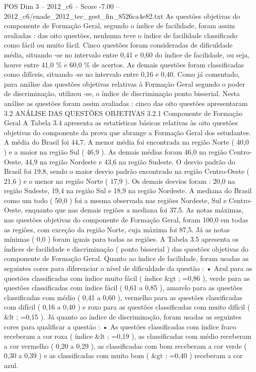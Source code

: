\begin{textsample}{POS Dim 3 – 2012\_c6 – Score -7.00 – 2012\_c6/enade\_2012\_tec\_gest\_fin\_8526ca4e82.txt}
As questões objetivas do componente de Formação Geral, segundo o índice de facilidade, foram assim avaliadas : das oito questões, nenhuma teve o índice de facilidade classificado como fácil ou muito fácil.
Cinco questões foram consideradas de dificuldade média, situando -se no intervalo entre 0,41 e 0,60 do índice de facilidade, ou seja, houve entre 41,0 \% e 60,0 \% de acertos.
As demais questões foram classificadas como difíceis, situando -se no intervalo entre 0,16 e 0,40.
Como já comentado, para análise das questões objetivas relativas à Formação Geral segundo o poder de discriminação, utilizou -se, o índice de discriminação ponto bisserial.
Nesta análise as questões foram assim avaliadas : cinco das oito questões apresentaram 3.2 ANÁLISE DAS QUESTÕES OBJETIVAS 3.2.1 Componente de Formação Geral A Tabela 3.4 apresenta as estatísticas básicas relativas às oito questões objetivas do componente da prova que abrange a Formação Geral dos estudantes.
A média do Brasil foi 44,7.
A menor média foi encontrada na região Norte ( 40,0 ) e a maior na região Sul ( 46,9 ).
As demais médias foram 46,0 na região Centro-Oeste, 44,9 na região Nordeste e 43,6 na região Sudeste.
O desvio padrão do Brasil foi 19,8, sendo o maior desvio padrão encontrado na região Centro-Oeste ( 21,6 ) e o menor na região Norte ( 17,9 ).
Os demais desvios foram : 20,0 na região Sudeste, 19,4 na região Sul e 18,9 na região Nordeste.
A mediana do Brasil como um todo ( 50,0 ) foi a mesma observada nas regiões Nordeste, Sul e Centro-Oeste, enquanto que nas demais regiões a mediana foi 37,5.
As notas máximas, nas questões objetivas do componente de Formação Geral, foram 100,0 em todas as regiões, com exceção da região Norte, cuja máxima foi 87,5.
Já as notas mínimas ( 0,0 ) foram iguais para todas as regiões.
A Tabela 3.5 apresenta os índices de facilidade e discriminação ( ponto bisserial ) das questões objetivas do componente de Formação Geral.
Quanto ao índice de facilidade, foram usadas as seguintes cores para diferenciar o nível de dificuldade da questão : • Azul para as questões classificadas com índice muito fácil ( índice \&gt ; =0,86 ), verde para as questões classificadas com índice fácil ( 0,61 a 0,85 ), amarelo para as questões classificadas com médio ( 0,41 a 0,60 ), vermelho para as questões classificadas com difícil ( 0,16 a 0,40 ) e roxo para as questões classificadas com muito difícil ( \&lt ; =0,15 ).
Já quanto ao índice de discriminação, foram usadas as seguintes cores para qualificar a questão : • As questões classificadas com índice fraco receberam a cor roxa ( índice \&lt ; =0,19 ), as classificadas com médio receberam a cor vermelho ( 0,20 a 0,29 ), as classificadas com bom receberam a cor verde ( 0,30 a 0,39 ) e as classificadas com muito bom ( \&gt ; =0,40 ) receberam a cor azul.

\end{textsample}
